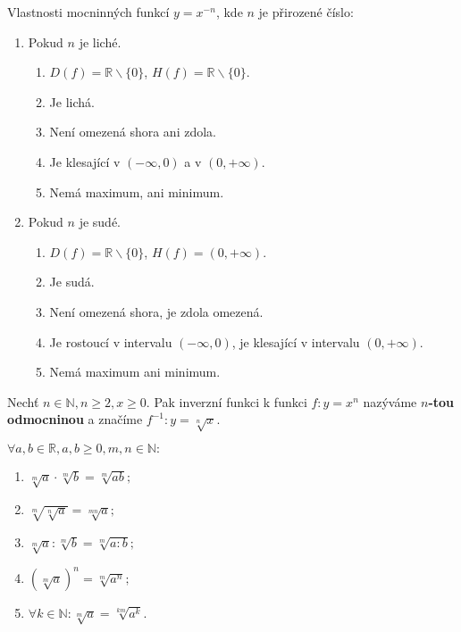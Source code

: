 \begin{veta}
  Vlastnosti mocninných funkcí $y= x^{-n}$, kde $n$ je přirozené číslo:
  \begin{enumerate}[1.]
    \item Pokud $n$ je liché.
    \begin{enumerate}[$i.$]
      \item $D(f)= \mathbb R \smallsetminus \{ 0\}$, $H(f)= \mathbb R \smallsetminus \{ 0 \}$.
      \item Je lichá.
      \item Není omezená shora ani zdola.
      \item Je klesající v $( -\infty,0)$ a v $( 0,+\infty )$.
      \item Nemá maximum, ani minimum.
    \end{enumerate}
    \item Pokud $n$ je sudé.
    \begin{enumerate}[$i.$]
      \item $D(f)= \mathbb R \smallsetminus \{ 0\}$, $H(f)= ( 0,+\infty )$.
      \item Je sudá.
      \item Není omezená shora, je zdola omezená.
      \item Je rostoucí v intervalu $( -\infty,0 ) $, je klesající v intervalu $( 0,+\infty )$.
      \item Nemá maximum ani minimum.
    \end{enumerate}
  \end{enumerate}
\end{veta}

\begin{definition}
    Nechť $n\in \mathbb N, n\geq 2, x \geq 0.$ Pak inverzní funkci k funkci
    $f:y=x^n$ nazýváme \textbf{$n$-tou odmocninou} a značíme $f^{-1}: y=\sqrt[n]{x}.$
\end{definition}

\begin{veta}
    $\forall a,b \in \mathbb R, a,b \geq 0, m,n \in \mathbb N:$
    \begin{enumerate}[$i.$]
        \item $\sqrt[m]{a}\cdot \sqrt[m]{b}=\sqrt[m]{ab};$
       	\item $\sqrt[m]{\sqrt[n]{a} } = \sqrt[mn]{a};$
       	\item $\sqrt[m]{a} : \sqrt[m]{b} = \sqrt[m]{a:b};$
       	\item $\left ( \sqrt[m]{a}  \right )^n = \sqrt[m]{a^n};$
       	\item $\forall k \in \mathbb N: \sqrt[m]{a}=\sqrt[km]{a^k}.$
    \end{enumerate}
\end{veta}


